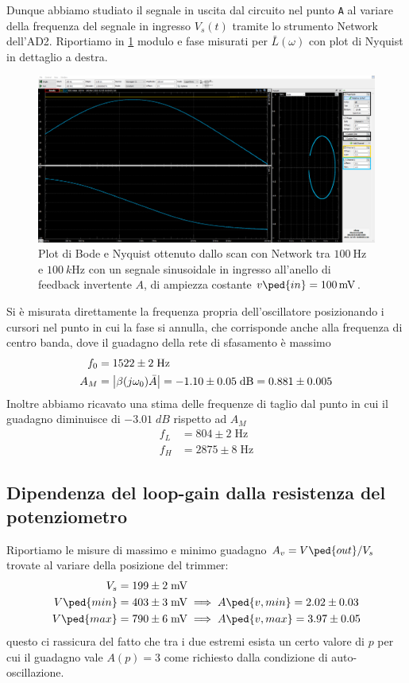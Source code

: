 \documentclass[10pt, a4paper, italian]{article}
\begin{document}
Dunque abbiamo studiato il segnale in uscita dal circuito nel punto \verb+A+
al variare della frequenza del segnale in ingresso $V_s (t)$ tramite lo
strumento Network dell'AD2. Riportiamo in \cref{fig: loopbode} modulo e fase
misurati per $\bar{L}(\omega)$ con plot di Nyquist in dettaglio a destra.
\begin{figure}[htbp]
    \centering
	\includegraphics[scale=0.335]{Aloop100Hz}
    \caption{Plot di Bode e Nyquist ottenuto dallo scan con Network tra
    $\SI{100}{\Hz}$ e $\SI{100}{k\Hz}$ con un segnale sinusoidale in ingresso
    all'anello di feedback invertente $A$, di ampiezza costante
    $v\ped{in} = \SI{100}{m\V}$. \label{fig: loopbode}}
\end{figure}

Si è misurata direttamente la frequenza propria dell'oscillatore posizionando
i cursori nel punto in cui la fase si annulla, che corrisponde anche alla
frequenza di centro banda, dove il guadagno della rete di sfasamento è massimo
\begin{align*}
f_0 &= 1522 \pm 2 \; \si{\Hz} \\
A_M &= \abs{\beta(j \omega_0) \bar{A}} =
-1.10 \pm 0.05 \; \si{dB} = 0.881 \pm 0.005
\end{align*}
Inoltre abbiamo ricavato una stima delle frequenze di taglio dal punto in cui
il guadagno diminuisce di $-3.01 \; \si{dB}$ rispetto ad $A_M$
\begin{align*}
f_L &= 804 \pm 2 \; \si{\Hz} \\
f_H &= 2875 \pm 8 \; \si{\Hz}
\end{align*}

\subsection{Dipendenza del loop-gain dalla resistenza del potenziometro}
Riportiamo le misure di massimo e minimo guadagno $A_v = V\ped{out}/V_s$
trovate al variare della posizione del trimmer:
\begin{align*}
V_s &= 199 \pm 2 \; \si{m\V} \\
V\ped{min} &= 403 \pm 3 \; \si{m\V} \implies  A\ped{v, min} =
2.02 \pm 0.03 \\
V\ped{max} &= 790 \pm 6 \; \si{m\V} \implies  A\ped{v, max} =
3.97 \pm 0.05\\
\end{align*}
questo ci rassicura del fatto che tra i due estremi esista un certo valore di
$p$ per cui il guadagno vale $A(p) = 3$ come richiesto dalla condizione di
auto-oscillazione.
\end{document}

